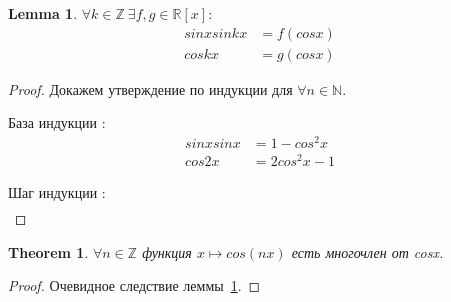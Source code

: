 \documentclass{article}
\newtheorem{theorem}{Theorem}
\newtheorem{lemma}{Lemma}
\begin{document}
\begin{lemma}
    \label{lemma:1}
    $\forall k \in \mathbb{Z} ~ \exists f, g \in \mathbb{R}[x] :$    
    \begin{align*} 
    sinxsinkx &= f(cosx) \\
    coskx &= g(cosx) 
    \end{align*}
\end{lemma}
\begin{proof}
Докажем утверждение по индукции для $\forall n \in \mathbb{N}$.
\item[База индукции]: 
\begin{align*}
    sinxsinx &= 1 - cos^2x \\
    cos2x &= 2cos^2x - 1
\end{align*}
\item[Шаг индукции]: 
\begin{align*}

\end{align*}
\end{proof}
    


\begin{theorem}
    $\forall n \in \mathbb{Z}$ функция $x \mapsto cos(nx)$ есть многочлен от cosx.    
\end{theorem}
\begin{proof}
    Очевидное следствие леммы~\ref{lemma:1}.
\end{proof}
\end{document}
